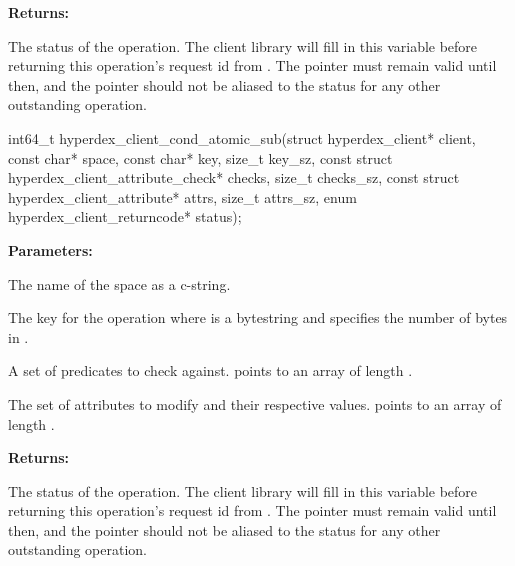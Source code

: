\noindent\textbf{Returns:}
\begin{description}[labelindent=\widthof{{\code{status}}},leftmargin=*,noitemsep,nolistsep,align=right]
\item[\code{status}] The status of the operation.  The client library will fill in this variable before returning this operation's request id from .  The pointer must remain valid until then, and the pointer should not be aliased to the status for any other outstanding operation.
\end{description}

\funcsep
{}
\begin{ccode}
int64_t hyperdex_client_cond_atomic_sub(struct hyperdex_client* client,
                const char* space,
                const char* key, size_t key_sz,
                const struct hyperdex_client_attribute_check* checks, size_t checks_sz,
                const struct hyperdex_client_attribute* attrs, size_t attrs_sz,
                enum hyperdex_client_returncode* status);
\end{ccode}
\funcdesc 

\noindent\textbf{Parameters:}
\begin{description}[labelindent=\widthof{{\code{checks}, \code{checks\_sz}}},leftmargin=*,noitemsep,nolistsep,align=right]
\item[\code{space}] The name of the space as a c-string.
\item[\code{key}, \code{key\_sz}] The key for the operation where  is a bytestring and  specifies the number of bytes in .
\item[\code{checks}, \code{checks\_sz}] A set of predicates to check against.   points to an array of length .
\item[\code{attrs}, \code{attrs\_sz}] The set of attributes to modify and their respective values.   points to an array of length .
\end{description}

\noindent\textbf{Returns:}
\begin{description}[labelindent=\widthof{{\code{status}}},leftmargin=*,noitemsep,nolistsep,align=right]
\item[\code{status}] The status of the operation.  The client library will fill in this variable before returning this operation's request id from .  The pointer must remain valid until then, and the pointer should not be aliased to the status for any other outstanding operation.
\end{description}

